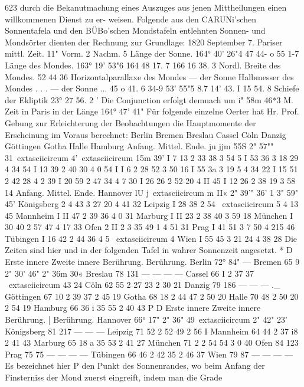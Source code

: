 \documentclass[12pt,a4paper]{article}
\begin{document}
{{{{{{{{623 durch  die  Bekanutmachung  eines  Auszuges  aus  jenen  Mittheilungen   einen  willkommenen  Dienst  zu  er- weisen. Folgende  aus  den  CARUNi'schen  Sonnentafela  und  den  BÜBo'schen  Mondstafeln  entlehnten  Sonnen- und  Mondsörter  dienten  der  Rechnung  zur  Grundlage: 1820  September  7.     Pariser  mittl.  Zeit. 11"  Vorm. 2     Nachm. 5 Länge  der Sonne. 164°  40'    26"4 47     44-  o 55       1-7 Länge  des Mondes. 163°  19'  53"6 164  48  17. 7 166     16     38. 3 Nordl.  Breite des  Mondes. 52 44 36 Horizontalparallaxe  des  Mondes ---  der  Sonne Halbmesser  des  Mondes  .     .     . ---  der  Sonne     ... 45  o 41.  6 34-9 53'    55"5 8.7 14'    43.  I 15     54.  8 Schiefe  der  Ekliptik 23°  27     56.  2 '     Die  Conjunction  erfolgt  demnach  um i"  58m  46*3  M.  Zeit  in  Paris in  der  Länge 164°  47'    41" Für  folgende   einzelne    Oerter   hat   Hr.   Prof.  Gebung  zur  Erleichterung   der   Beobachtungen  die Hauptmomente  der  Erscheinung  im  Voraus  berechnet: Berlin Bremen Breslau Cassel Cöln Danzig Göttingen Gotha Halle Hamburg Anfang. Mittel. Ende. ju    jjm  55S 2" 57""  31\	extasciicircum{}{ } 4'\	extasciicircum{}{ } 15m  39' I       7     13 2 33     38 3 54       5 I     53     36 3 18     29 4 34     54 I      13     39 2 40     30 4 0     54 I       I       6 2 28     52 3 50     16 I     55     3a 3 19       5 4 34     22 I     15     51 2 42     28 4 2     39 I     20     59 2 47     34 4 7     30 I     26     26 2 52     20 4 II     45 I     12     26 2 38     19 3 58     14 Anfang. Mittel. Ende. Hannover lU    j\	extasciicircum{}{ }m II« 2"  39'" 36'  1  3"  59"  45' Königsberg 2          4 43 3     27 20 4    41     32 Leipzig I    28 38 2     54 \	extasciicircum{}{ }5 4     13     45 Mannheim I     II 47 2     39 36 4      0     31 Marburg I     II 23 2     38 40 3     59     18 München I     30 40 2     57 47 4     17     33 Ofen 2       II 2 3     35 49   1  4     51     31 Prag I    41 51 3       7 50 4     215     46 Tübingen I    16 42 2     44 36 4       5     \	extasciicircum{}{ }4 Wien I     55 45 3     21 24 4     38     28 Die  Zeiten  sind  hier  und  in  der  folgenden  Tafel  in  wahrer  Sonnenzeit  angesetzt. * D Erste  innere Zweite  innere Berührung. Berührung. Berlin 72° 84" --- Bremen 65 9 2"  30'    46" 2"  36m  30« Breslau 78 131 ---   --- ---   --- Cassel 66 I 2     37     37 \	extasciicircum{}{ }     43     24 Cöln 62 55 2     27     23 2     30     21 Danzig 79 186 ---    --- ---    .\_ Göttingen 67 10 2     39     37 2     45     19 Gotha 68 18 2     44     47 2     50     20 Halle 70 48 2     50     20 2     54     19 Hamburg 66 36 i     35     55 2     40     43 P D Erste  innere Zweite  innere Berührung.  |  Berührung. Hannover 66° 17" 2"  36"  49\	extasciicircum{}{ }       2"  42"  23' Königsberg 81 217 ---   --- --- Leipzig 71 52 2     52    49 2     56      I Mannheim 64 44 2     37     i8 2     41     43 Marburg 65 18 a     35     53 2       41        27 München 71 2 2     54     54 3          0       40 Ofen 84 123 Prag 75 75 ---    --- ---      --- Tübingen 66 46 2     42     35 2     46     37 Wien 79 87 ---    --- ---    --- Es  bezeichnet  hier    P  den  Punkt  des  Sonnenrandes,  wo    beim  Anfang  der  Finsterniss  der  Mond  zuerst eingreift,  indem  man  die  Grade  }}}}}}}}
\end{document}
